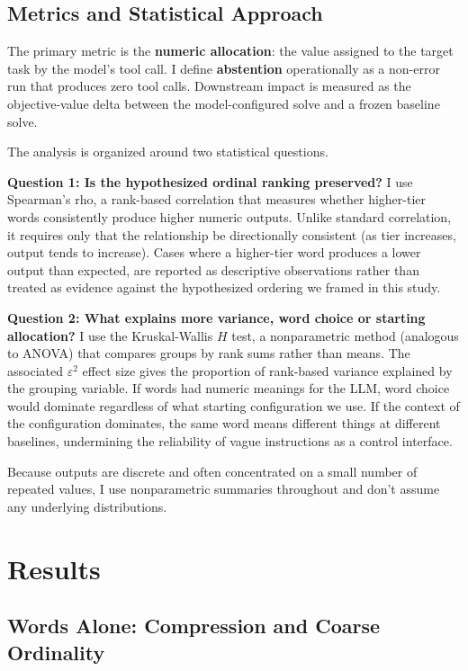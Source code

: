 \documentclass[11pt]{article}
\begin{document}
\subsection{Metrics and Statistical Approach}

The primary metric is the \textbf{numeric allocation}: the value assigned to the target task by the model's tool call. I define \textbf{abstention} operationally as a non-error run that produces zero tool calls. Downstream impact is measured as the objective-value delta between the model-configured solve and a frozen baseline solve.

The analysis is organized around two statistical questions.

\textbf{Question 1: Is the hypothesized ordinal ranking preserved?} I use Spearman's rho, a rank-based correlation that measures whether higher-tier words
consistently produce higher numeric outputs. Unlike standard correlation, it requires only 
that the relationship be directionally consistent (as tier increases, output tends to
increase). Cases where a
higher-tier word produces a lower output than expected, are reported as descriptive
observations rather than treated as evidence against the hypothesized ordering we framed in this study. 

\textbf{Question 2: What explains more variance, word choice or starting allocation?} I use the Kruskal-Wallis $H$ test, a nonparametric method (analogous to ANOVA) that compares groups by rank sums rather than means. The associated $\varepsilon^2$ effect size gives the proportion of rank-based variance explained by the grouping variable. If words had numeric meanings for the LLM, word choice would dominate regardless of what starting configuration we use. If the context of the configuration dominates, the same word means different things at different baselines, undermining the reliability of vague instructions as a control interface.

Because outputs are discrete and often concentrated on a small number of repeated values, I use nonparametric summaries throughout and don't assume any underlying distributions.

\section{Results}

\subsection{Words Alone: Compression and Coarse Ordinality}
\end{document}
